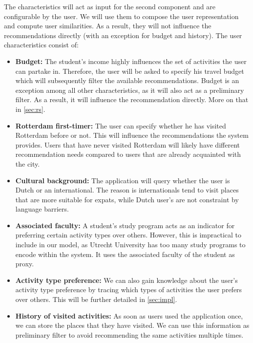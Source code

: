 \documentclass[11pt,a4paper,oneside]{article}
\begin{document}
The characteristics will act as input for the second component and are configurable by the user. We will use them to compose the user representation and compute user similarities. As a result, they will not influence the recommendations directly (with an exception for budget and history). The user characteristics consist of: 
\begin{itemize}
\item \textbf{Budget:} The student's income highly influences the set of activities the user can partake in. Therefore, the user will be asked to specify his travel budget which will subsequently filter the available recommendations. Budget is an exception among all other characteristics, as it will also act as a preliminary filter. As a result, it will influence the recommendation directly. More on that in \autoref{sec:rs}.

\item \textbf{Rotterdam first-timer:} The user can specify whether he has visited Rotterdam before or not. This will influence the recommendations the system provides. Users that have never visited Rotterdam will likely have different recommendation needs compared to users that are already acquainted with the city.

\item \textbf{Cultural background:} The application will query whether the user is Dutch or an international. The reason is internationals tend to visit places that are more suitable for expats, while Dutch user's are not constraint by language barriers.

\item \textbf{Associated faculty:} A student's study program acts as an indicator for preferring certain activity types over others. However, this is impractical to include in our model, as Utrecht University has too many study programs to encode within the system. It uses the associated faculty of the student as proxy.

\item \textbf{Activity type preference:} We can also gain knowledge about the user's activity type preference by tracing which types of activities the user prefers over others. This will be further detailed in \autoref{sec:impl}.

\item \textbf{History of visited activities:} As soon as users used the application once, we can store the places that they have visited. We can use this information as preliminary filter to avoid recommending the same activities multiple times.  
\end{itemize}
\end{document}
